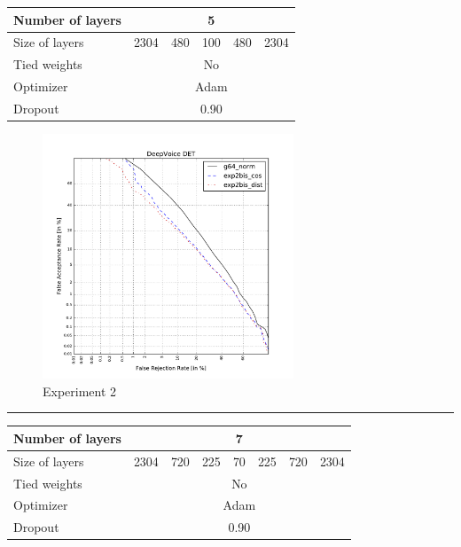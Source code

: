\documentclass[conference]{IEEEtran}
\begin{document}
\newpage

\begin{table}[!h]
\centering
\begin{tabular}{|l|c|c|c|c|c|}
\hline
Number of layers & \multicolumn{5}{c|}{5}                \\ \hline
Size of layers   & 2304   & 480   & 100  & 480  & 2304   \\ \hline
Tied weights     & \multicolumn{5}{c|}{No}               \\ \hline
Optimizer        & \multicolumn{5}{c|}{Adam} \\ \hline
Dropout          & \multicolumn{5}{c|}{0.90} \\ \hline
\end{tabular}
\end{table}


\begin{figure}[!h]
    \centering
    \includegraphics[width=7.5cm]{../scores/det2bis.pdf}
    \captionsetup{labelformat=empty}
    \caption{Experiment 2}
\end{figure}

\hrule
\vspace{0.5cm}

\begin{table}[!h]
\centering
\begin{tabular}{|l|c|c|c|c|c|c|c|}
\hline
Number of layers & \multicolumn{7}{c|}{7}                \\ \hline
Size of layers   & 2304 & 720 & 225 & 70 & 225 & 720 & 2304  \\ \hline
Tied weights     & \multicolumn{7}{c|}{No}               \\ \hline
Optimizer        & \multicolumn{7}{c|}{Adam} \\ \hline
Dropout          & \multicolumn{7}{c|}{0.90} \\ \hline
\end{tabular}
\end{table}
\end{document}
